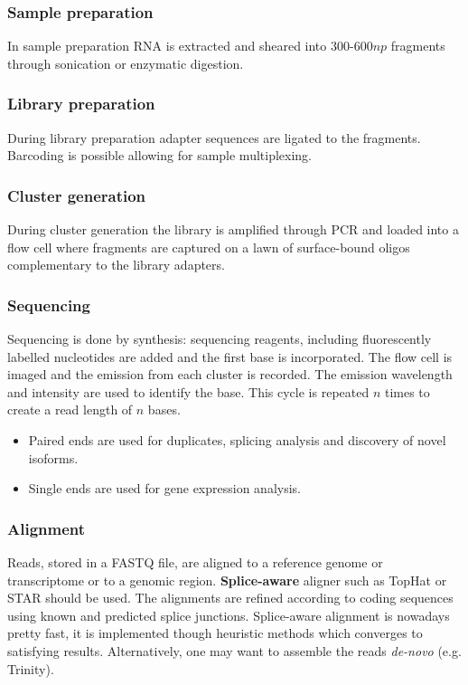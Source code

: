 		\subsubsection{Sample preparation}
		In sample preparation RNA is extracted and sheared into $300$-$600np$ fragments through sonication or enzymatic digestion.

		\subsubsection{Library preparation}
		During library preparation adapter sequences are ligated to the fragments.
		Barcoding is possible allowing for sample multiplexing.

		\subsubsection{Cluster generation}
		During cluster generation the library is amplified through PCR and loaded into a flow cell where fragments are captured on a lawn of surface-bound oligos complementary to the library adapters.

		\subsubsection{Sequencing}
		Sequencing is done by synthesis: sequencing reagents, including fluorescently labelled nucleotides are added and the first base is incorporated.
		The flow cell is imaged and the emission from each cluster is recorded.
		The emission wavelength and intensity are used to identify the base.
		This cycle is repeated $n$ times to create a read length of $n$ bases.

		\begin{multicols}{2}
			\begin{itemize}
				\item Paired ends are used for duplicates, splicing analysis and discovery of novel isoforms.
				\item Single ends are used for gene expression analysis.
			\end{itemize}
		\end{multicols}

		\subsubsection{Alignment}
		Reads, stored in a FASTQ file, are aligned to a reference genome or transcriptome or to a genomic region.
		\textbf{Splice-aware} aligner such as TopHat or STAR should be used.
		The alignments are refined according to coding sequences using known and predicted splice junctions.
		Splice-aware alignment is nowadays pretty fast, it is implemented though heuristic methods which converges to satisfying results.
		Alternatively, one may want to assemble the reads \textit{de-novo} (e.g. Trinity).

